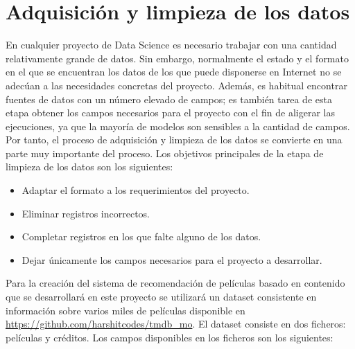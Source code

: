 \chapter{Adquisición y limpieza de los datos}\label{chap:adq}

En cualquier proyecto de Data Science es necesario trabajar con una cantidad relativamente grande de datos. Sin embargo, normalmente el estado y el formato en el que se encuentran los datos de los que puede disponerse en Internet no se adecúan a las necesidades concretas del proyecto. Además, es habitual encontrar fuentes de datos con un número elevado de campos; es también tarea de esta etapa obtener los campos necesarios para el proyecto con el fin de aligerar las ejecuciones, ya que la mayoría de modelos son sensibles a la cantidad de campos. Por tanto, el proceso de adquisición y limpieza de los datos se convierte en una parte muy importante del proceso. Los objetivos principales de la etapa de limpieza de los datos son los siguientes:
\begin{itemize}
    \item Adaptar el formato a los requerimientos del proyecto.
    \item Eliminar registros incorrectos.
    \item Completar registros en los que falte alguno de los datos.
    \item Dejar únicamente los campos necesarios para el proyecto a desarrollar.
\end{itemize}

Para la creación del sistema de recomendación de películas basado en contenido que se desarrollará en este proyecto se utilizará un dataset consistente en información sobre varios miles de películas disponible en \url{https://github.com/harshitcodes/tmdb_mo}. El dataset consiste en dos ficheros: películas y créditos. Los campos disponibles en los ficheros son los siguientes:

